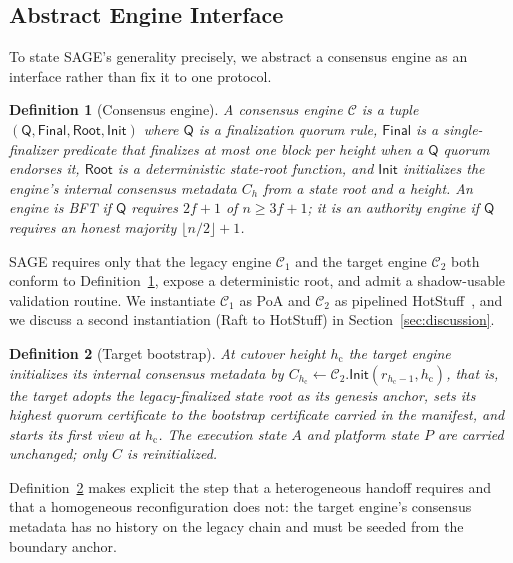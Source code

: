 \documentclass[journal]{IEEEtran}
\newtheorem{definition}{Definition}
\theoremstyle{remark}
\begin{document}
\subsection{Abstract Engine Interface}
To state SAGE's generality precisely, we abstract a consensus engine as an interface rather
than fix it to one protocol.
\begin{definition}[Consensus engine]
\label{def:engine}
A consensus engine $\mathcal{C}$ is a tuple $(\mathsf{Q}, \mathsf{Final}, \mathsf{Root},
\mathsf{Init})$ where $\mathsf{Q}$ is a finalization quorum rule, $\mathsf{Final}$ is a
single-finalizer predicate that finalizes at most one block per height when a $\mathsf{Q}$
quorum endorses it, $\mathsf{Root}$ is a deterministic state-root function, and
$\mathsf{Init}$ initializes the engine's internal consensus metadata $C_h$ from a state root
and a height. An engine is BFT if $\mathsf{Q}$ requires $2f+1$ of $n \ge 3f+1$; it is an
authority engine if $\mathsf{Q}$ requires an honest majority $\lfloor n/2\rfloor+1$.
\end{definition}
SAGE requires only that the legacy engine $\mathcal{C}_1$ and the target engine
$\mathcal{C}_2$ both conform to Definition~\ref{def:engine}, expose a deterministic root, and
admit a shadow-usable validation routine. We instantiate $\mathcal{C}_1$ as PoA and
$\mathcal{C}_2$ as pipelined HotStuff~\cite{hotstuff}, and we discuss a second instantiation
(Raft to HotStuff) in Section~\ref{sec:discussion}.

\begin{definition}[Target bootstrap]
\label{def:bootstrap}
At cutover height $h_{\mathrm{c}}$ the target engine initializes its internal consensus
metadata by $C_{h_{\mathrm{c}}} \gets \mathcal{C}_2.\mathsf{Init}(r_{h_{\mathrm{c}}-1},
h_{\mathrm{c}})$, that is, the target adopts the legacy-finalized state root as its genesis
anchor, sets its highest quorum certificate to the bootstrap certificate carried in the
manifest, and starts its first view at $h_{\mathrm{c}}$. The execution state $A$ and platform
state $P$ are carried unchanged; only $C$ is reinitialized.
\end{definition}
Definition~\ref{def:bootstrap} makes explicit the step that a heterogeneous handoff requires
and that a homogeneous reconfiguration does not: the target engine's consensus metadata has no
history on the legacy chain and must be seeded from the boundary anchor.
\end{document}
